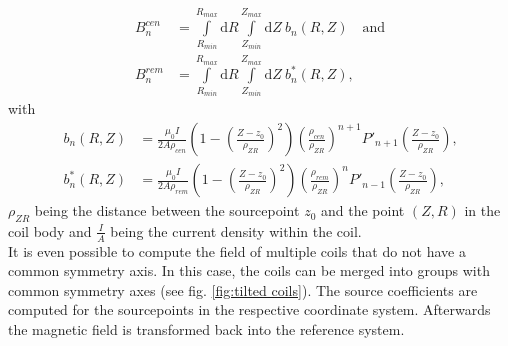	\begin{equation}
		\begin{aligned}
			B_{n}^{cen} &= \int\limits_{R_{min}}^{R_{max}} \mathrm{d}R \int\limits_{Z_{min}}^{Z_{max}} \mathrm{d}Z ~b_{n}(R,Z) \quad\text{and}  \\
			B_{n}^{rem} &= \int\limits_{R_{min}}^{R_{max}} \mathrm{d}R \int\limits_{Z_{min}}^{Z_{max}} \mathrm{d}Z ~b_{n}^{*}(R,Z)\text{,}
		\end{aligned}
		\label{eq:source coefficients integrals}
	\end{equation}
	with
	\begin{equation}
		\begin{aligned}
			b_{n}(R,Z) &= \frac{\mu_{0}I}{2A\rho_{cen}} \left( 1 - \left(\frac{Z-z_0}{\rho_{ZR}}\right)^{2}\right)\left(\frac{\rho_{cen}}{\rho_{ZR}}\right)^{n+1} P'_{n+1}\left(\frac{Z-z_0}{\rho_{ZR}}\right) \text{,}  \\
			b_{n}^{*}(R,Z) &= \frac{\mu_{0}I}{2A\rho_{rem}} \left( 1 - \left(\frac{Z-z_0}{\rho_{ZR}}\right)^{2}\right)\left(\frac{\rho_{rem}}{\rho_{ZR}}\right)^{n} P'_{n-1}\left(\frac{Z-z_0}{\rho_{ZR}}\right)\text{,}
		\end{aligned}
		\label{eq:source coefficients}
	\end{equation}
	$\rho_{ZR}$ being the distance between the sourcepoint $z_0$ and the point $(Z,R)$ in the coil body and $\frac{I}{A}$ being the current density within the coil. 
	\\ 
	It is even possible to compute the field of multiple coils that do not have a common symmetry axis. In this case, the coils can be merged into groups with common symmetry axes (see fig. \ref{fig:tilted coils}). The source coefficients are computed for the sourcepoints in the respective coordinate system. Afterwards the magnetic field is transformed back into the reference system.

